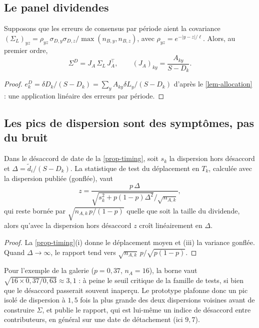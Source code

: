 \subsection{Le panel dividendes}
\begin{proposition}\label{prop-sigmaD}
Supposons que les erreurs de consensus par période aient la covariance
$(\Sigma_L)_{yz}=\rho_{yz}\,\sigma_{D,y}\sigma_{D,z}/\max(n_{B,y},n_{B,z})$, avec $\rho_{yz}=e^{-|y-z|/\ell}$. Alors, au premier
ordre,
\begin{equation}\label{eq-sigmaD}
\Sigma^D=J_A\,\Sigma_L\,J_A^\top,\qquad (J_A)_{ky}=\frac{A_{ky}}{S-D_k}.
\end{equation}
\end{proposition}
\begin{proof}
$e^D_k=\delta D_k/(S-D_k)=\sum_yA_{ky}\delta L_y/(S-D_k)$ d'après le \cref{lem-allocation} : une application linéaire des
erreurs par période.
\end{proof}

\subsection{Les pics de dispersion sont des symptômes, pas du bruit}
\begin{proposition}[Masquage]\label{prop-masking}
Dans le désaccord de date de la \cref{prop-timing}, soit $s_k$ la dispersion hors désaccord et $\Delta=\tilde d_i/(S-D_k)$.
La statistique de test du déplacement en $T_k$, calculée avec la dispersion publiée (gonflée), vaut
\begin{equation}\label{eq-masking}
z=\frac{p\,\Delta}{\sqrt{s_k^2+p(1-p)\Delta^2}/\sqrt{n_{A,k}}},
\end{equation}
qui reste bornée par $\sqrt{n_{A,k}\,p/(1-p)}$ quelle que soit la taille du dividende, alors qu'avec la dispersion hors
désaccord $z$ croît linéairement en $\Delta$.
\end{proposition}
\begin{proof}
La \cref{prop-timing}(i) donne le déplacement moyen et (iii) la variance gonflée. Quand $\Delta\to\infty$, le rapport
tend vers $\sqrt{n_{A,k}}\,p/\sqrt{p(1-p)}$.
\end{proof}

\begin{example}
Pour l'exemple de la galerie ($p=0{,}37$, $n_A=16$), la borne vaut $\sqrt{16\times0{,}37/0{,}63}\approx3{,}1$ : à peine
le seuil critique de la famille de tests, si bien que le désaccord passerait souvent inaperçu. Le prototype plafonne donc
un pic isolé de dispersion à $1{,}5$ fois la plus grande des deux dispersions voisines avant de construire $\Sigma$, et
publie le rapport, qui est lui-même un indice de désaccord entre contributeurs, en général sur une date de détachement
(ici $9{,}7$).
\end{example}


